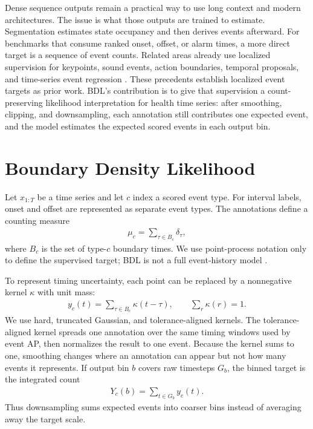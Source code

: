 \documentclass{article}
\newcommand{\xseq}{x_{1:T}}
\newcommand{\kernel}{\kappa}
\begin{document}
Dense sequence outputs remain a practical way to use long context and modern
architectures.
The issue is what those outputs are trained to estimate.
Segmentation estimates state occupancy and then derives events afterward.
For benchmarks that consume ranked onset, offset, or alarm times, a more
direct target is a sequence of event counts.
Related areas already use localized supervision for keypoints, sound events,
action boundaries, temporal proposals, and time-series event regression
\citep{newell2016stacked,xiao2018simple,phan2015,gao2017turn,lin2018bsn,lin2019bmn,azib2023universal}.
These precedents establish localized event targets as prior work.
BDL's contribution is to give that supervision a count-preserving likelihood
interpretation for health time series: after smoothing, clipping, and
downsampling, each annotation still contributes one expected event, and the
model estimates the expected scored events in each output bin.

\section{Boundary Density Likelihood}

Let $\xseq$ be a time series and let $c$ index a scored event type.
For interval labels, onset and offset are represented as separate event types.
The annotations define a counting measure
\begin{align}
  \mu_c = \sum_{\tau\in B_c}\delta_\tau,
\end{align}
where $B_c$ is the set of type-$c$ boundary times.
We use point-process notation only to define the supervised target; BDL is not
a full event-history model \citep{kingman1993,shchur2021neural}.

To represent timing uncertainty, each point can be replaced by a nonnegative
kernel $\kernel$ with unit mass:
\begin{align}
  y_c(t) = \sum_{\tau\in B_c}\kernel(t-\tau), \qquad
  \sum_r \kernel(r)=1.
  \label{eq:smooth}
\end{align}
We use hard, truncated Gaussian, and tolerance-aligned kernels.
The tolerance-aligned kernel spreads one annotation over the same timing
windows used by event AP, then normalizes the result to one event.
Because the kernel sums to one, smoothing changes where an annotation can
appear but not how many events it represents.
If output bin $b$ covers raw timesteps $G_b$, the binned target is the
integrated count
\begin{align}
  Y_c(b) = \sum_{t\in G_b} y_c(t).
  \label{eq:bin}
\end{align}
Thus downsampling sums expected events into coarser bins instead of averaging
away the target scale.
\end{document}
